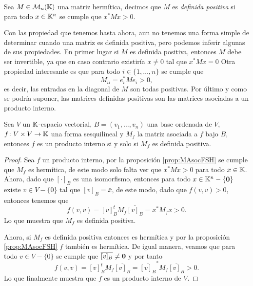 \begin{defi}
  Sea $M \in \mathcal{M}_n(\mathbb{K})$ una matriz hermítica, decimos que $M$ es \emph{definida positiva} si para todo $x \in \mathbb{K}^n$ se cumple que $x^* M x > 0$.
\end{defi}

Con las propiedad que tenemos hasta ahora, aun no tenemos una forma simple de determinar cuando una matriz es definida positiva, pero podemos inferir algunas de sus propiedades. En primer lugar si $M$ es definida positiva, entonces $M$ debe ser invertible, ya que en caso contrario existiría $x \neq 0$ tal que $x^* M x = 0$ Otra propiedad interesante es que para todo $i \in \{1,\ldots,n\}$ se cumple que
\[
  M_{ii} = e_i^* M e_i > 0,
\]
es decir, las entradas en la diagonal de $M$ son todas positivas. Por último y como se podría suponer, las matrices definidas positivas son las matrices asociadas a un producto interno.

\begin{teor}
  Sea $V$ un $\mathbb{K}$-espacio vectorial, $B = (v_1,\ldots,v_n)$ una base ordenada de $V$, $f\colon V\times V \to\mathbb{K}$ una forma sesquilineal y $M_f$ la matriz asociada a $f$ bajo $B$, entonces $f$ es un producto interno si y solo si $M_f$ es definida positiva.
\end{teor}
\begin{proof}
  Sea $f$ un producto interno, por la proposición \ref{prop:MAsocFSH} se cumple que $M_f$ es hermítica, de este modo solo falta ver que $x^* M x > 0$ para todo $x \in \mathbb{K}$. Ahora, dado que $[\cdot]_B$ es una isomorfismo, entonces para todo $x \in \mathbb{K}^n-\{\mathbf{0}\}$ existe $v \in V - \{0\}$ tal que $[v]_B = \bar x$, de este modo, dado que $f(v,v)>0$, entonces tenemos que
  \[
    f(v,v) = [v]_B^t M_f \overline{[v]_B} = x^* M_f x > 0.
  \]
  Lo que muestra que $M_f$ es definida positiva.

  Ahora, si $M_f$ es definida positiva entonces es hermítica y por la proposición \ref{prop:MAsocFSH} $f$ también es hermítica. De igual manera, veamos que para todo $v\in V - \{0\}$ se cumple que $\overline{[v]_B} \neq \mathbf{0}$ y por tanto
  \[
    f(v,v) = [v]_B^t M_f \overline{[v]_B} = \overline{[v]_B}^* M_f \overline{[v]_B} > 0.
  \]
  Lo que finalmente muestra que $f$ es un producto interno de $V$.
\end{proof}